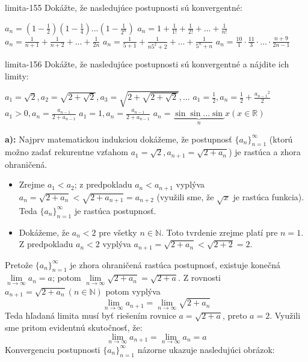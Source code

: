 \begin{defproblem}{limita-155}
Dokážte, že nasledujúce postupnosti sú konvergentné:
\begin{tasks}
\task $a_n=(1-\frac{1}{2})(1-\frac{1}{4})...(1-\frac{1}{2^n})$
\task $a_n=1+\frac{1}{1!}+\frac{1}{2!}+...+\frac{1}{n!}$
\task $a_n=\frac{1}{n+1}+\frac{1}{n+2}+...+\frac{1}{2n}$
\task $a_n=\frac{1}{5+1}+\frac{1}{n5^2+2}+...+\frac{1}{5^n+n}$
\task $a_n=\frac{10}{1}\cdot \frac{11}{3}\cdot ...\cdot \frac{n+9}{2n-1}$
\end{tasks}
\end{defproblem}

\begin{defproblem}{limita-156}
Dokážte, že nasledujúce postupnosti sú konvergentné a nájdite ich limity:
\begin{tasks}
\task $a_1=\sqrt{2}, a_2=\sqrt{2+\sqrt{2}}, a_3=\sqrt{2+\sqrt{2+\sqrt{2}}},...$
\task $a_1=\frac{1}{2}, a_n=\frac{1}{2}+\frac{{a_{n-1}}^{2}}{2}$
\task $a_1>0, a_n=\frac{a_{n-1}}{2+a_{n-1}}$
\task $a_1=1, a_n=\frac{a_{n-1}}{2+a_{n-1}}$
\task $a_n=\underbrace{\sin \sin ... \sin}_n x (x \in \mathbb{R})$
\end{tasks}

\begin{solution}
    \textbf{a):}
    Najprv matematickou indukciou dokážeme, že postupnosť
    ${\{a_n\}}_{n=1}^\infty$ (ktorú možno zadať rekurentne vzťahom
    $a_1=\sqrt{2},a_{n+1}=\sqrt{2+a_n}$) je rastúca a zhora ohraničená.
    \begin{itemize}
    \item
        Zrejme $a_1<a_2$; z predpokladu $a_n<a_{n+1}$ vyplýva
        $a_n=\sqrt{2+a_n}<\sqrt{2+a_{n+1}}=a_{n+2}$ (využili sme, že $\sqrt{x}$
        je rastúca funkcia). Teda ${\{a_n\}}_{n=1}^\infty$ je rastúca
        postupnosť.
    \item
        Dokážeme, že $a_n<2$ pre všetky $n \in \mathbb{N}$. Toto tvrdenie zrejme
        platí pre $n=1$. Z predpokladu $a_n<2$ vyplýva
        $a_{n+1}=\sqrt{2+a_{n}}<\sqrt{2+2}=2$.
    \end{itemize}

    Pretože ${\{a_n\}}_{n=1}^\infty$ je zhora ohraničená rastúca postupnosť,
    existuje konečná $\lim\limits_{n \rightarrow \infty} a_n=a$; potom
    $\lim\limits_{n \rightarrow \infty}\sqrt{2+a_n}=\sqrt{2+a}$. Z rovnosti
    $a_{n+1}=\sqrt{2+a_n} (n \in \mathbb{N})$ potom vyplýva
    \[
        \lim\limits_{n \rightarrow \infty} a_{n+1}
        = \lim\limits_{n \rightarrow \infty} \sqrt{2+a_n}
    \]
    Teda hľadaná limita musí byť riešením rovnice $a=\sqrt{2+a}$,
    preto $a=2$. Využili sme pritom evidentnú skutočnosť, že:
    \[
        \lim\limits_{n \rightarrow \infty} a_{n+1}
        =\lim\limits_{n \rightarrow \infty} a_n=a
    \]
    Konvergenciu postupnosti ${\{a_n\}}_{n=1}^\infty$ názorne ukazuje
    nasledujúci obrázok:


\end{solution}
\end{defproblem}
